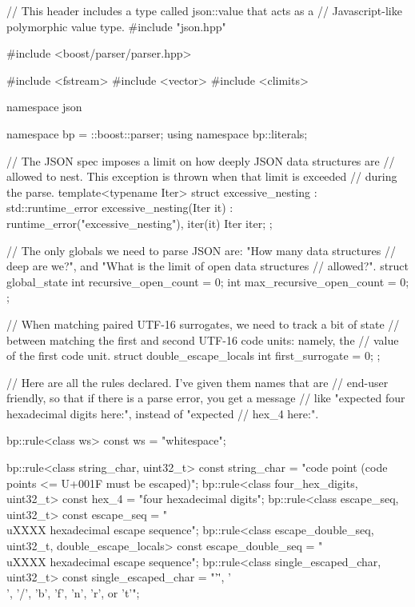 \begin{code}
// This header includes a type called json::value that acts as a
// Javascript-like polymorphic value type.
#include "json.hpp"

#include <boost/parser/parser.hpp>

#include <fstream>
#include <vector>
#include <climits>


namespace json {

    namespace bp = ::boost::parser;
    using namespace bp::literals;

    // The JSON spec imposes a limit on how deeply JSON data structures are
    // allowed to nest.  This exception is thrown when that limit is exceeded
    // during the parse.
    template<typename Iter>
    struct excessive_nesting : std::runtime_error
    {
        excessive_nesting(Iter it) :
            runtime_error("excessive_nesting"),
            iter(it)
        {}
        Iter iter;
    };


    // The only globals we need to parse JSON are: "How many data structures
    // deep are we?", and "What is the limit of open data structures
    // allowed?".
    struct global_state
    {
        int recursive_open_count = 0;
        int max_recursive_open_count = 0;
    };

    // When matching paired UTF-16 surrogates, we need to track a bit of state
    // between matching the first and second UTF-16 code units: namely, the
    // value of the first code unit.
    struct double_escape_locals
    {
        int first_surrogate = 0;
    };


    // Here are all the rules declared.  I've given them names that are
    // end-user friendly, so that if there is a parse error, you get a message
    // like "expected four hexadecimal digits here:", instead of "expected
    // hex_4 here:".

    bp::rule<class ws> const ws = "whitespace";

    bp::rule<class string_char, uint32_t> const string_char =
        "code point (code points <= U+001F must be escaped)";
    bp::rule<class four_hex_digits, uint32_t> const hex_4 =
        "four hexadecimal digits";
    bp::rule<class escape_seq, uint32_t> const escape_seq =
        "\\uXXXX hexadecimal escape sequence";
    bp::rule<class escape_double_seq, uint32_t, double_escape_locals> const
        escape_double_seq = "\\uXXXX hexadecimal escape sequence";
    bp::rule<class single_escaped_char, uint32_t> const single_escaped_char =
        "'\"', '\\', '/', 'b', 'f', 'n', 'r', or 't'";

}
\end{code}

